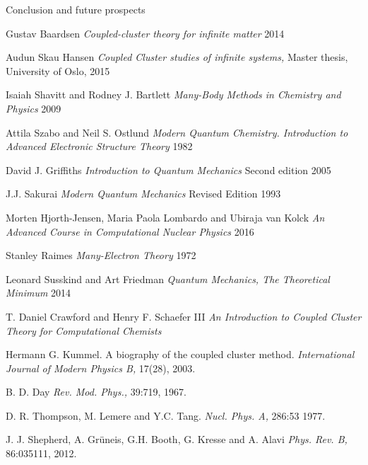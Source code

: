\documentclass[twoside,english]{uiofysmaster}
\begin{document}
\begin{chapter}{Conclusion and future prospects}
	
\end{chapter}


\medskip


\begin{thebibliography}{9}

	Gustav Baardsen
	\textit{Coupled-cluster theory for infinite matter} 2014

	Audun Skau Hansen
	\textit{Coupled Cluster studies of infinite systems,} Master thesis, University of Oslo, 2015

	Isaiah Shavitt and Rodney J. Bartlett
	\textit{Many-Body Methods in Chemistry and Physics} 2009

	Attila Szabo and Neil S. Ostlund
	\textit{Modern Quantum Chemistry. Introduction to Advanced Electronic Structure Theory} 1982

	David J. Griffiths
	\textit{Introduction to Quantum Mechanics} Second edition 2005

	J.J. Sakurai
	\textit{Modern Quantum Mechanics} Revised Edition 1993

	Morten Hjorth-Jensen, Maria Paola Lombardo and Ubiraja van Kolck
	\textit{An Advanced Course in Computational Nuclear Physics} 2016

	Stanley Raimes
	\textit{Many-Electron Theory} 1972

	Leonard Susskind and Art Friedman
	\textit{Quantum Mechanics, The Theoretical Minimum} 2014

	T. Daniel Crawford and Henry F. Schaefer III
	\textit{An Introduction to Coupled Cluster Theory for Computational Chemists} 

	Hermann G. Kummel. A biography of the coupled cluster method. 
	\textit{International Journal of Modern Physics B,} 17(28), 2003. 

	B. D. Day
	\textit{Rev. Mod. Phys.,}
	39:719, 1967.

	D. R. Thompson, M. Lemere and Y.C. Tang.
	\textit{Nucl. Phys. A,} 286:53 1977.

	J. J. Shepherd, A. Grüneis, G.H. Booth, G. Kresse and A. Alavi 
	\textit{Phys. Rev. B,} 86:035111, 2012.


\end{thebibliography}
\end{document}
